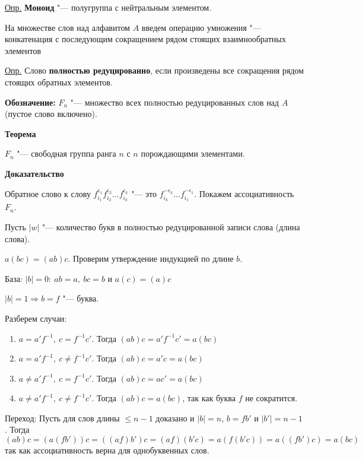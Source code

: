 \documentclass{article}
\begin{document}
\underline{Опр.} \textbf{Моноид} "--- полугруппа с нейтральным элементом.

\vspace{10pt}

На множестве слов над алфавитом $A$ введем операцию умножения "--- конкатенация с последующим сокращением рядом стоящих взаимнообратных элементов

\underline{Опр.} Слово \textbf{полностью редуцированно}, если произведены все сокращения рядом стоящих обратных элементов.

\textbf{Обозначение:} $F_n$ "--- множество всех полностью редуцированных слов над $A$ (пустое слово включено).

\vspace{10pt}

\textbf{Теорема}

$F_n$ "--- свободная группа ранга $n$ с $n$ порождающими элементами.

\textbf{Доказательство}

Обратное слово к слову $f_{i_1}^{\epsilon_1}f_{i_2}^{\epsilon_2}...f_{i_k}^{\epsilon_k}$ "--- это $f_{i_k}^{-\epsilon_k}...f_{i_1}^{-\epsilon_1}$. Покажем ассоциативность $F_n$. 

Пусть $|w|$ "--- количество букв в полностью редуцированной записи слова (длина слова).

$a(bc) = (ab)c$. Проверим утверждение индукцией по длине $b$.

База: $|b| = 0: \  ab = a, \  bc = b$ и $a(c) = (a)c$

$|b| = 1 \Rightarrow b = f$ "--- буква. 

Разберем случаи:
\begin{enumerate}
	\item $a = a'f^{-1}, \  c = f^{-1}c'$. Тогда $(ab)c = a'f^{-1}c' = a(bc)$
	\item $a = a'f^{-1}, \  c \neq f^{-1}c'$. Тогда $(ab)c = a'c = a(bc)$
	\item $a \neq a'f^{-1}, \  c = f^{-1}c'$. Тогда $(ab)c = ac' = a(bc)$
	\item $a \neq a'f^{-1}, \  c \neq f^{-1}c'$. Тогда $(ab)c = a(bc)$, так как буква $f$ не сократится.
\end{enumerate}

Переход: Пусть для слов длины $\leq n - 1$ доказано и $|b| = n$, $b = fb'$ и $|b'| = n - 1$. Тогда $(ab)c = (a(fb'))c = ((af)b')c = (af)(b'c) = a(f(b'c)) = a((fb')c) = a(bc)$ так как ассоциативность верна для однобуквенных слов.

\vspace{10pt}
\end{document}
